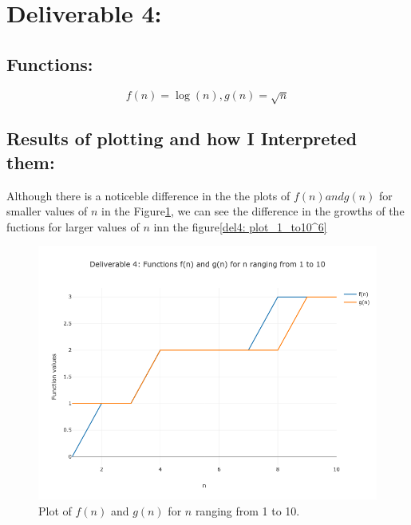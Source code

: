 \documentclass{article}
\begin{document}
\section{Deliverable 4:}
\subsection{Functions: }
\[
    f(n) = \log(n), g(n) = \sqrt{n} 
\]

\subsection{Results of plotting and how I Interpreted them: }
Although there is a noticeble difference in the the plots of  \(f(n) and g(n)\) for smaller values of \(n\) in the Figure\ref{del4: plot_1_to_10}, we can see the difference in the growths of the fuctions for larger values of \(n\) inn the figure\ref{del4: plot_1_to10^6}
\begin{figure}[H]
    \centering
    \includegraphics[width=\textwidth]{Deliverable 4: plot_1_to_10.png}
    \caption{Plot of $f(n)$ and $g(n)$ for $n$ ranging from 1 to 10.}
    \label{del4: plot_1_to_10}
\end{figure}
\end{document}
